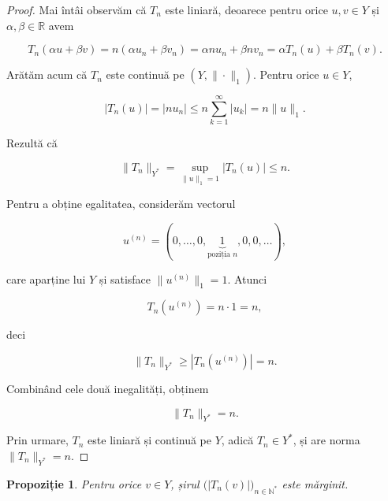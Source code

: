 \documentclass[12pt]{article}
\theoremstyle{definition}
\theoremstyle{plain}
\newtheorem{proposition}{Propoziție}
\begin{document}
\begin{proof}
Mai întâi observăm că $T_n$ este liniară, deoarece pentru orice $u,v \in Y$ și $\alpha,\beta \in \mathbb{R}$ avem


\[
T_n(\alpha u + \beta v)
= n(\alpha u_n + \beta v_n)
= \alpha n u_n + \beta n v_n
= \alpha T_n(u) + \beta T_n(v).
\]



Arătăm acum că $T_n$ este continuă pe $(Y,\|\cdot\|_1)$. Pentru orice $u \in Y$,


\[
|T_n(u)|
= |n u_n|
\le n \sum_{k=1}^\infty |u_k|
= n \|u\|_1.
\]


Rezultă că


\[
\|T_n\|_{Y^*}
= \sup_{\|u\|_1 = 1} |T_n(u)|
\le n.
\]



Pentru a obține egalitatea, considerăm vectorul


\[
u^{(n)} = (0,\dots,0,\underbrace{1}_{\text{poziția } n},0,0,\dots),
\]


care aparține lui $Y$ și satisface $\|u^{(n)}\|_1 = 1$. Atunci


\[
T_n(u^{(n)}) = n \cdot 1 = n,
\]


deci


\[
\|T_n\|_{Y^*}
\ge |T_n(u^{(n)})|
= n.
\]



Combinând cele două inegalități, obținem


\[
\|T_n\|_{Y^*} = n.
\]


Prin urmare, $T_n$ este liniară și continuă pe $Y$, adică $T_n \in Y^*$, și are norma \\$\|T_n\|_{Y^*} = n$.


\end{proof}

\begin{proposition}
Pentru orice $v \in Y$, șirul $\bigl(\lvert T_n(v)\rvert\bigr)_{n \in \mathbb{N}^\ast}$ este mărginit.
\end{proposition}
\end{document}
